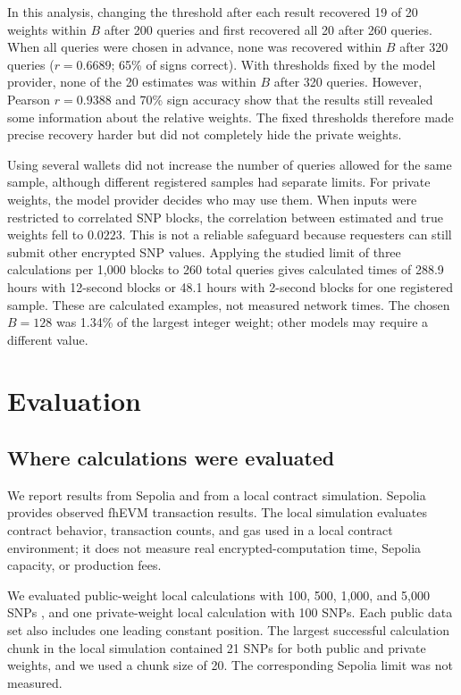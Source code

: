 \documentclass[10pt]{article}
\begin{document}
In this analysis, changing the threshold after each result recovered 19 of 20 weights
within $B$ after 200 queries and first recovered all 20 after 260 queries. When all
queries were chosen in advance, none was recovered within $B$ after 320 queries
($r=0.6689$; 65\% of signs correct). With thresholds fixed by the model provider, none
of the 20 estimates was within $B$ after 320 queries.  However, Pearson $r=0.9388$ and
70\% sign accuracy show that the results still revealed some information about the
relative weights.  The fixed thresholds therefore made precise recovery harder but did
not completely hide the private weights.

Using several wallets did not increase the number of queries allowed for the same
sample, although different registered samples had separate limits.  For private
weights, the model provider decides who may use them.  When inputs were restricted to
correlated SNP blocks, the correlation between estimated and true weights fell to
$0.0223$.  This is not a reliable safeguard because requesters can still submit other
encrypted SNP values. Applying the studied limit of three calculations per 1,000 blocks
to 260 total queries gives calculated times of 288.9 hours with 12-second blocks or
48.1 hours with 2-second blocks for one registered sample. These are calculated examples,
not measured network times. The chosen $B=128$ was 1.34\% of the largest integer weight;
other models may require a different value.

\section{Evaluation}
\label{sec:evaluation}

\subsection{Where calculations were evaluated}

We report results from Sepolia and from a local contract simulation.  Sepolia provides
observed fhEVM transaction results.  The local simulation evaluates contract behavior,
transaction counts, and gas used in a local contract environment; it does not measure
real encrypted-computation time, Sepolia capacity, or production fees.

We evaluated public-weight local calculations with 100, 500, 1,000, and 5,000 SNPs
\citep{knight2026heprs}, and one private-weight local calculation with 100 SNPs.  Each
public data set also includes one leading constant position.  The largest successful calculation
chunk in the local simulation contained 21 SNPs for both public and private weights, and
we used a chunk size of 20.  The corresponding Sepolia limit was not measured.
\end{document}
